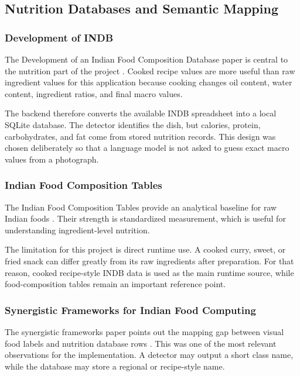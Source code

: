 \subsection{Nutrition Databases and Semantic Mapping}

\subsubsection{Development of INDB}

The Development of an Indian Food Composition Database paper is central to the nutrition part of the project \cite{development_indb_2024}. Cooked recipe values are more useful than raw ingredient values for this application because cooking changes oil content, water content, ingredient ratios, and final macro values.

The backend therefore converts the available INDB spreadsheet into a local SQLite database. The detector identifies the dish, but calories, protein, carbohydrates, and fat come from stored nutrition records. This design was chosen deliberately so that a language model is not asked to guess exact macro values from a photograph.

\subsubsection{Indian Food Composition Tables}

The Indian Food Composition Tables provide an analytical baseline for raw Indian foods \cite{ifct_2017}. Their strength is standardized measurement, which is useful for understanding ingredient-level nutrition.

The limitation for this project is direct runtime use. A cooked curry, sweet, or fried snack can differ greatly from its raw ingredients after preparation. For that reason, cooked recipe-style INDB data is used as the main runtime source, while food-composition tables remain an important reference point.

\subsubsection{Synergistic Frameworks for Indian Food Computing}

The synergistic frameworks paper points out the mapping gap between visual food labels and nutrition database rows \cite{synergistic_frameworks_2025}. This was one of the most relevant observations for the implementation. A detector may output a short class name, while the database may store a regional or recipe-style name.


